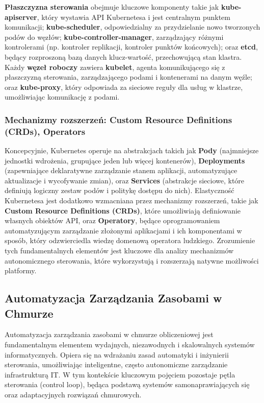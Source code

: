\textbf{Płaszczyzna sterowania} obejmuje kluczowe komponenty takie jak \textbf{kube-apiserver}, który wystawia API Kubernetesa i jest centralnym punktem komunikacji; \textbf{kube-scheduler}, odpowiedzialny za przydzielanie nowo tworzonych podów do węzłów; \textbf{kube-controller-manager}, zarządzający różnymi kontrolerami (np. kontroler replikacji, kontroler punktów końcowych); oraz \textbf{etcd}, będący rozproszoną bazą danych klucz-wartość, przechowującą stan klastra. Każdy \textbf{węzeł roboczy} zawiera \textbf{kubelet}, agenta komunikującego się z płaszczyzną sterowania, zarządzającego podami i kontenerami na danym węźle; oraz \textbf{kube-proxy}, który odpowiada za sieciowe reguły dla usług w klastrze, umożliwiając komunikację z podami.

\subsubsection{Mechanizmy rozszerzeń: Custom Resource Definitions (CRDs), Operators}

Koncepcyjnie, Kubernetes operuje na abstrakcjach takich jak \textbf{Pody} (najmniejsze jednostki wdrożenia, grupujące jeden lub więcej kontenerów), \textbf{Deployments} (zapewniające deklaratywne zarządzanie stanem aplikacji, automatyzujące aktualizacje i wycofywanie zmian), oraz \textbf{Services} (abstrakcje sieciowe, które definiują logiczny zestaw podów i politykę dostępu do nich). Elastyczność Kubernetesa jest dodatkowo wzmacniana przez mechanizmy rozszerzeń, takie jak \textbf{Custom Resource Definitions (CRDs)}, które umożliwiają definiowanie własnych obiektów API, oraz \textbf{Operatory}, będące oprogramowaniem automatyzującym zarządzanie złożonymi aplikacjami i ich komponentami w sposób, który odzwierciedla wiedzę domenową operatora ludzkiego. Zrozumienie tych fundamentalnych elementów jest kluczowe dla analizy mechanizmów autonomicznego sterowania, które wykorzystują i rozszerzają natywne możliwości platformy.





\subsection{Automatyzacja Zarządzania Zasobami w Chmurze}

Automatyzacja zarządzania zasobami w chmurze obliczeniowej jest fundamentalnym elementem wydajnych, niezawodnych i skalowalnych systemów informatycznych. Opiera się na wdrażaniu zasad automatyki i inżynierii sterowania, umożliwiając inteligentne, często autonomiczne zarządzanie infrastrukturą IT. W tym kontekście kluczowym pojęciem pozostaje pętla sterowania (control loop), będąca podstawą systemów samonaprawiających się oraz adaptacyjnych rozwiązań chmurowych.

